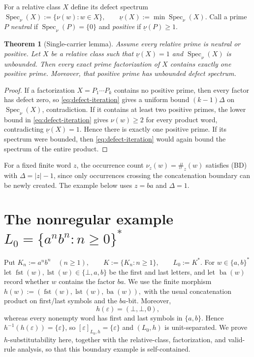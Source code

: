 \documentclass[11pt,a4paper]{article}
\newtheorem{theorem}{Theorem}[section]
\newcommand{\eps}{\varepsilon}
\newcommand{\Spec}{\operatorname{Spec}}
\newcommand{\fst}{\operatorname{fst}}
\newcommand{\lst}{\operatorname{lst}}
\begin{document}
For a relative class $X$ define its defect spectrum
\(\Spec_\nu(X):=\{\nu(w):w\in X\}, \qquad \underline\nu(X):=\min\Spec_\nu(X).\)
Call a prime $P$ \emph{neutral} if $\Spec_\nu(P)=\{0\}$ and \emph{positive} if $\underline\nu(P)\ge1$.

\begin{theorem}[Single-carrier lemma]
\label{thm:single-carrier}
Assume every relative prime is neutral or positive.  Let $X$ be a relative class such that
\(\underline\nu(X)=1\)
and $\Spec_\nu(X)$ is unbounded.  Then every exact prime factorization of $X$ contains exactly one positive prime.  Moreover, that positive prime has unbounded defect spectrum.
\end{theorem}

\begin{proof}
If a factorization $X=P_1\cdots P_k$ contains no positive prime, then every factor has defect zero, so \eqref{eq:defect-iteration} gives a uniform bound $(k-1)\Delta$ on $\Spec_\nu(X)$, contradiction.  If it contains at least two positive primes, the lower bound in \eqref{eq:defect-iteration} gives $\nu(w)\ge2$ for every product word, contradicting $\underline\nu(X)=1$.  Hence there is exactly one positive prime.  If its spectrum were bounded, then \eqref{eq:defect-iteration} would again bound the spectrum of the entire product.
\end{proof}

For a fixed finite word $z$, the occurrence count $\nu_z(w)=\#_z(w)$ satisfies (BD) with $\Delta=|z|-1$, since only occurrences crossing the concatenation boundary can be newly created.  The example below uses $z=ba$ and $\Delta=1$.

\section{The nonregular example \texorpdfstring{$L_0=\{a^n b^n:n\ge0\}^*$}{The nonregular example L0}}
\label{sec:L0}

Put
\(K_n:=a^n b^n\quad(n\ge1), \qquad K:=\{K_n:n\ge1\}, \qquad L_0:=K^*.\)
For $w\in\{a,b\}^*$ let $\fst(w),\lst(w)\in\{\bot,a,b\}$ be the
first and last letters, and let $\operatorname{ba}(w)$ record whether
$w$ contains the factor $ba$.  We use the finite morphism
\(h(w):=(\fst(w),\lst(w),\operatorname{ba}(w)),\)
with the usual concatenation product on first/last symbols and the
$ba$-bit.  Moreover,
\[
  h(\eps)=(\bot,\bot,0),
\]
whereas every nonempty word has first and last symbols in $\{a,b\}$.  Hence $h^{-1}(h(\eps))=\{\eps\}$, so $[\eps]_{L_0,h}=\{\eps\}$ and $(L_0,h)$ is unit-separated.  We prove $h$-substitutability here, together with the relative-class, factorization, and valid-rule analysis, so that this boundary example is self-contained.
\end{document}
